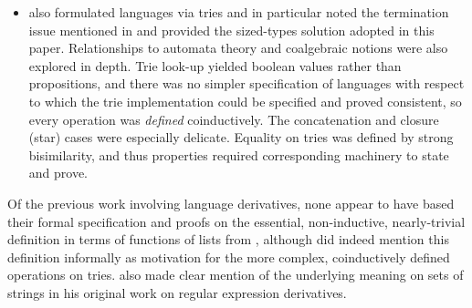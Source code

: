 \documentclass[acmsmall,screen,anonymous,timestamp]{acmart}
\begin{document}
\begin{itemize}
\item \citet{Abel2016} also formulated languages via tries and in particular noted the termination issue mentioned in  and provided the sized-types solution adopted in this paper.
Relationships to automata theory and coalgebraic notions were also explored in depth.
Trie look-up yielded boolean values rather than propositions, and there was no simpler specification of languages with respect to which the trie implementation could be specified and proved consistent, so every operation was \emph{defined} coinductively.
The concatenation and closure (star) cases were especially delicate.
Equality on tries was defined by strong bisimilarity, and thus properties required corresponding machinery to state and prove.


\end{itemize}

Of the previous work involving language derivatives, none appear to have based their formal specification and proofs on the essential, non-inductive, nearly-trivial definition in terms of functions of lists from , although \citet{Abel2016} did indeed mention this definition informally as motivation for the more complex, coinductively defined operations on tries.
\citet{Brzozowski64} also made clear mention of the underlying meaning on sets of strings in his original work on regular expression derivatives.


\end{document}

